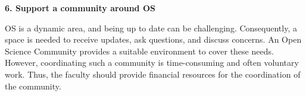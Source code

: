 \documentclass[gc, manuscript]{copernicus}
\begin{document}
\textbf{6. Support a community around OS}

OS is a dynamic area, and being up to date can be challenging.
Consequently, a space is needed to receive updates, ask questions, and
discuss concerns. An Open Science Community provides a suitable
environment to cover these needs. However, coordinating such a community
is time-consuming and often voluntary work. Thus, the faculty should
provide financial resources for the coordination of the community.


















\end{document}
